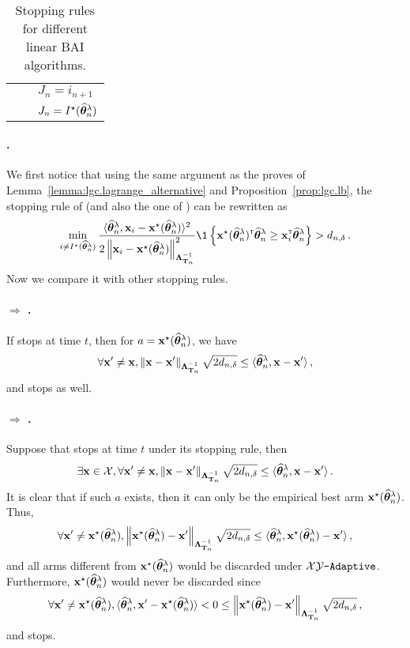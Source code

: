 \begin{table}[ht]
\begin{tabular}{@{}lll@{}}
		\midrule
		\LG & \makecell{$\max_{i\in \cI} \inf_{\btheta'\in\neg i} \dfrac{\normm{\hbtheta_n^\lambda-\btheta'}^2_{\bLambda_{\bT_n}}}{2}\geq d_{n,\delta}$} & $J_n = i_{n+1}$ \\
		\LGC & \makecell{$\max_{i\in \cI} \inf_{\btheta'\in\neg i} \dfrac{\normm{\hbtheta_n^\lambda-\btheta'}^2_{\bLambda_{\bT_n}}}{2}\geq d_{n,\delta}$} & $J_n = I^\star(\widehat{{\boldsymbol \theta}}_n^\lambda)$ \\
		\bottomrule
	\end{tabular}
	\caption{Stopping rules for different linear BAI algorithms.}
	\label{tab:stopping_rules}
\end{table}

\paragraph{\LG{}.}
We first notice that using the same argument as the proves of Lemma~\ref{lemma:lgc.lagrange_alternative} and Proposition~\ref{prop:lgc.lb}, the stopping rule of \LG (and also the one of \GLUCB{}) can be rewritten as
\[
	\min_{i \neq \Istar(\hbtheta_n^\lambda)} \dfrac{\langle\hbtheta_n^\lambda,\bx_i-\bx^\star(\hbtheta_n^\lambda)\rangle^2}{2\normm{\bx_i - \bx^\star(\hbtheta_n^\lambda)}_{{\bLambda_{\bT_n}^{-1}}}^2} \1\left\{\bx^\star(\hbtheta_n^\lambda)^\top\hbtheta_n^\lambda \geq \bx_i^\top\hbtheta_n^\lambda\right\} > d_{n,\delta}\,.
\]
Now we compare it with other stopping rules.

\paragraph{\LG{} $\Rightarrow$ \XYS{}.}
If \LG{} stops at time $t$, then for $a = {\bf x}^\star(\widehat{{\boldsymbol \theta}}_n^\lambda)$, we have
\[
    \forall {\bf x}'\neq {\bf x}, \left\lVert{\bf x}-{\bf x}'\right\rVert_{{\boldsymbol \Lambda}_{{\bf T}_n}^{-1}}\sqrt{2d_{n,\delta}}\leq \langle\widehat{{\boldsymbol \theta}}_n^\lambda,{\bf x}-{\bf x}'\rangle\,,
\]
and \XYS{} stops as well.

\paragraph{\XYS{} $\Rightarrow$ \XYA{}.}
Suppose that \XYS{} stops at time $t$ under its stopping rule, then
\[
\exists {\bf x}\in\mathcal{X}, \forall {\bf x}'\neq {\bf x}, \left\lVert{\bf x}-{\bf x}'\right\rVert_{{\boldsymbol \Lambda}_{{\bf T}_n}^{-1}}\sqrt{2d_{n,\delta}}\leq \langle\widehat{{\boldsymbol \theta}}_n^\lambda,{\bf x}-{\bf x}'\rangle\,.
\]
It is clear that if such $a$ exists, then it can only be the empirical best arm ${\bf x}^\star(\widehat{{\boldsymbol \theta}}_n^\lambda)$. Thus,
\[
    \forall {\bf x}'\neq {\bf x}^\star(\widehat{{\boldsymbol \theta}}_n^\lambda), \left\lVert{\bf x}^\star(\widehat{{\boldsymbol \theta}}_n^\lambda)-{\bf x}'\right\rVert_{{\boldsymbol \Lambda}_{{\bf T}_n}^{-1}}\sqrt{2d_{n,\delta}}\leq\langle\widehat{{\boldsymbol \theta}}_n^\lambda,{\bf x}^\star(\widehat{{\boldsymbol \theta}}_n^\lambda)-{\bf x}'\rangle\,,
\]
and all arms different from ${\bf x}^\star(\widehat{{\boldsymbol \theta}}_n^\lambda)$ would be discarded under $\texttt{$\mathcal{X}\mathcal{Y}$-Adaptive}$. Furthermore, ${\bf x}^\star(\widehat{{\boldsymbol \theta}}_n^\lambda)$ would never be discarded since
\[
    \forall {\bf x}'\neq {\bf x}^\star(\widehat{{\boldsymbol \theta}}_n^\lambda), \langle\widehat{{\boldsymbol \theta}}_n^\lambda,{\bf x}'-{\bf x}^\star(\widehat{{\boldsymbol \theta}}_n^\lambda)\rangle < 0 \le \left\lVert{\bf x}^\star(\widehat{{\boldsymbol \theta}}_n^\lambda)-{\bf x}'\right\rVert_{{\boldsymbol \Lambda}_{{\bf T}_n}^{-1}}\sqrt{2d_{n,\delta}}\,,
\]
and \XYA{} stops.

